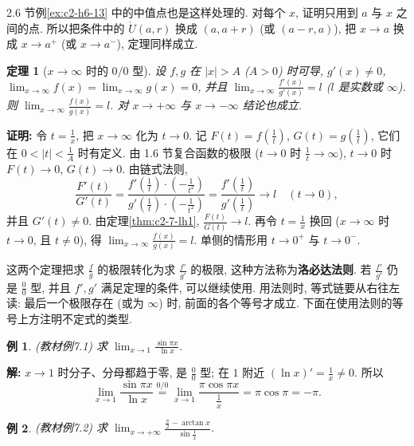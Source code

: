 \documentclass[UTF8,openany]{ctexbook}
\theoremstyle{chinesetextbook}
\newtheorem{example}{例}[section]
\newtheorem{theorem}{定理}[section]
\newenvironment{cnproof}{\par\indent\textbf{证明:} \ignorespaces}{\par}
\newenvironment{cnsolution}{\par\indent\textbf{解:} \ignorespaces}{\par}
\begin{document}
2.6 节例\ref{ex:c2-h6-13} 中的中值点也是这样处理的. 对每个 $x$, 证明只用到 $a$ 与 $x$ 之间的点. 所以把条件中的 $\mathring U(a,r)$ 换成 $(a,a+r)$ (或 $(a-r,a)$), 把 $x\to a$ 换成 $x\to a^+$ (或 $x\to a^-$), 定理同样成立.
\begin{theorem}[$x\to\infty$ 时的 $0/0$ 型]\label{thm:c2-7-lh2}
设 $f,g$ 在 $|x|>A$ ($A>0$) 时可导, $g'(x)\ne0$, $\displaystyle\lim_{x\to\infty}f(x)=\lim_{x\to\infty}g(x)=0$, 并且 $\displaystyle\lim_{x\to\infty}\frac{f'(x)}{g'(x)}=l$ ($l$ 是实数或 $\infty$). 则 $\displaystyle\lim_{x\to\infty}\frac{f(x)}{g(x)}=l$. 对 $x\to+\infty$ 与 $x\to-\infty$ 结论也成立.
\end{theorem}
\begin{cnproof}
令 $\displaystyle t=\frac1x$, 把 $x\to\infty$ 化为 $t\to0$. 记 $\displaystyle F(t)=f\left(\frac1t\right)$, $\displaystyle G(t)=g\left(\frac1t\right)$, 它们在 $\displaystyle0<|t|<\frac1A$ 时有定义. 由 1.6 节复合函数的极限 ($t\to0$ 时 $\displaystyle\frac1t\to\infty$), $t\to0$ 时 $F(t)\to0$, $G(t)\to0$. 由链式法则,
\[
\frac{F'(t)}{G'(t)}=\frac{f'\left(\frac1t\right)\cdot\left(-\frac1{t^2}\right)}{g'\left(\frac1t\right)\cdot\left(-\frac1{t^2}\right)}=\frac{f'\left(\frac1t\right)}{g'\left(\frac1t\right)}\to l\quad(t\to0),
\]
并且 $G'(t)\ne0$. 由定理\ref{thm:c2-7-lh1}, $\displaystyle\frac{F(t)}{G(t)}\to l$. 再令 $\displaystyle t=\frac1x$ 换回 ($x\to\infty$ 时 $t\to0$, 且 $t\ne0$), 得 $\displaystyle\lim_{x\to\infty}\frac{f(x)}{g(x)}=l$. 单侧的情形用 $t\to0^+$ 与 $t\to0^-$.
\end{cnproof}
这两个定理把求 $\displaystyle\frac fg$ 的极限转化为求 $\displaystyle\frac{f'}{g'}$ 的极限, 这种方法称为\textbf{洛必达法则}. 若 $\displaystyle\frac{f'}{g'}$ 仍是 $\displaystyle\frac00$ 型, 并且 $f',g'$ 满足定理的条件, 可以继续使用. 用法则时, 等式链要从右往左读: 最后一个极限存在 (或为 $\infty$) 时, 前面的各个等号才成立. 下面在使用法则的等号上方注明不定式的类型.
\begin{example}\label{ex:c2-7-1}
\textnormal{(教材例7.1)} 求 $\displaystyle\lim_{x\to1}\frac{\sin\pi x}{\ln x}$.
\end{example}
\begin{cnsolution}
$x\to1$ 时分子、分母都趋于零, 是 $\displaystyle\frac00$ 型; 在 $1$ 附近 $\displaystyle(\ln x)'=\frac1x\ne0$. 所以
\[
\lim_{x\to1}\frac{\sin\pi x}{\ln x}\overset{0/0}{=}\lim_{x\to1}\frac{\pi\cos\pi x}{\frac1x}=\pi\cos\pi=-\pi.
\]
\end{cnsolution}
\begin{example}\label{ex:c2-7-2}
\textnormal{(教材例7.2)} 求 $\displaystyle\lim_{x\to+\infty}\frac{\frac\pi2-\arctan x}{\sin\frac1x}$.
\end{example}
\end{document}
